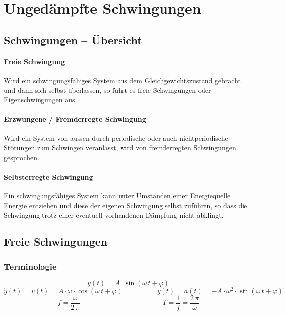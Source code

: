\section{Ungedämpfte Schwingungen}

\subsection{Schwingungen -- Übersicht}

\paragraph{Freie Schwingung}

Wird ein schwingungsfähiges System aus dem Gleichgewichtszustand gebracht 
und dann sich selbst überlassen, so führt es freie Schwingungen oder Eigenschwingungen aus.


\medskip

\paragraph{Erzwungene / Fremderregte Schwingung}

Wird ein System von aussen durch periodische oder auch nichtperiodische Störungen zum
Schwingen veranlasst, wird von fremderregten Schwingungen gesprochen. 


\medskip

\paragraph{Selbsterregte Schwingung}

Ein schwingungsfähiges System kann unter Umständen einer Energiequelle Energie entziehen
und diese der eigenen Schwingung selbst zuführen, so dass die Schwingung trotz einer
eventuell vorhandenen Dämpfung nicht abklingt. 


\subsection{Freie Schwingungen}

\subsubsection{Terminologie}

\vspace{-0.2cm}
$$ \boxed{  y(t) = A \cdot \sin(\omega \, t + \varphi) } $$
\[
    \dot{y}(t) =  v(t) = A \cdot \omega \cdot \cos(\omega \, t + \varphi) 
    \qquad \qquad \quad
    \ddot{y}(t) = a(t) = - A \cdot \omega^2 \cdot \sin(\omega \, t + \varphi) 
\]
\[
    \boxed{ f = \frac{\omega}{2 \, \pi} }
    \qquad \qquad \qquad \qquad \qquad \qquad
    \boxed{ T = \frac{1}{f} = \frac{2 \, \pi}{\omega} }
\]


